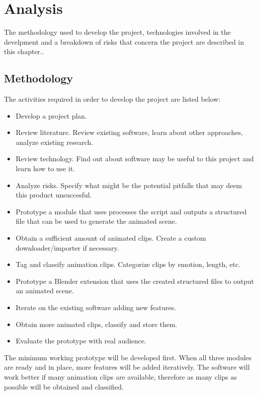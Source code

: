 \chapter{Analysis \label{chap:analysis}}

The methodology used to develop the project, technologies involved in the develpment and a breakdown of risks that concern the project are described in this chapter..


\section{Methodology}

The activities required in order to develop the project are listed below:

\begin{itemize}
\item Develop a project plan.
\item Review literature. Review existing software, learn about other approaches, analyze existing research.
\item Review technology. Find out about software may be useful to this project and learn how to use it.
\item Analyze risks. Specify what might be the potential pitfalls that may deem this product unsuccesful.
\item Prototype a module that uses processes the script and outputs a structured file that can be used to generate the animated scene.
\item Obtain a sufficient amount of animated clips. Create a custom downloader/importer if necessary.
\item Tag and classify animation clips. Categorize clips by emotion, length, etc.
\item Prototype a Blender extension that uses the created structured files to output an animated scene.
\item Iterate on the existing software adding new features.
\item Obtain more animated clips, classify and store them.
\item Evaluate the prototype with real audience.
\end{itemize}

The minimum working prototype will be developed first. When all three modules are ready and in place, more features will be added iteratively. The software will work better if many animation clips are available, therefore as many clips as possible will be obtained and classified.

